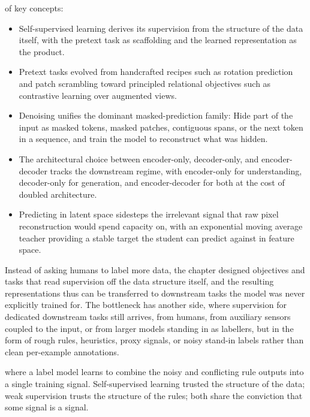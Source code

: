  of key concepts:
\begin{itemize}
    \item Self-supervised learning derives its supervision from the structure of the data itself, with the pretext task as scaffolding and the learned representation as the product.
    \item Pretext tasks evolved from handcrafted recipes such as rotation prediction and patch scrambling toward principled relational objectives such as contrastive learning over augmented views.
    \item Denoising unifies the dominant masked-prediction family: Hide part of the input as masked tokens, masked patches, contiguous spans, or the next token in a sequence, and train the model to reconstruct what was hidden.
    \item The architectural choice between encoder-only, decoder-only, and encoder-decoder tracks the downstream regime, with encoder-only for understanding, decoder-only for generation, and encoder-decoder for both at the cost of doubled architecture.
    \item Predicting in latent space sidesteps the irrelevant signal that raw pixel reconstruction would spend capacity on, with an exponential moving average teacher providing a stable target the student can predict against in feature space.
\end{itemize}


Instead of asking humans to label more data, the chapter designed objectives and tasks that read supervision off the data structure itself,
and the resulting representations thus can be transferred to downstream tasks the model was never explicitly trained for.
The bottleneck has another side, where supervision for dedicated downstream tasks still arrives,
from humans, from auxiliary sensors coupled to the input, or from larger models standing in as labellers,
but in the form of rough rules, heuristics, proxy signals, or noisy stand-in labels
rather than clean per-example annotations.

where a label model learns to combine the noisy and conflicting rule outputs into a single training signal.
Self-supervised learning trusted the structure of the data; weak supervision trusts the structure of the rules;
both share the conviction that some signal is a signal.


